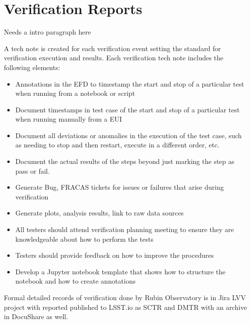 \newpage
\section{Verification Reports}

Needs a intro paragraph here


A tech note is created for each verification event setting the standard for verification execution and results.  Each verification tech note includes the following elements:

\begin{itemize}

	\item Annotations in the EFD to timestamp the start and stop of a particular test when running from a notebook or script
	\item Document timestamps in test case of the start and stop of a particular test when running manually from a EUI
	\item Document all deviations or anomalies in the execution of the test case, such as needing to stop and then restart, execute in a different order, etc.
	\item Document the actual results of the steps beyond just marking the step as pass or fail.
	\item Generate Bug, FRACAS tickets for issues or failures that arise during verification
	\item Generate plots, analysis results, link to raw data sources
	\item All testers should attend verification planning meeting to ensure they are knowledgeable about how to perform the tests
	\item Testers should provide feedback on how to improve the procedures
	\item Develop a Jupyter notebook template that shows how to structure the notebook and how to create annotations
	
\end{itemize}

Formal detailed records of verification done by Rubin Observatory is in Jira LVV project with reported published to LSST.io as SCTR and DMTR with an archive in DocuShare as well.
